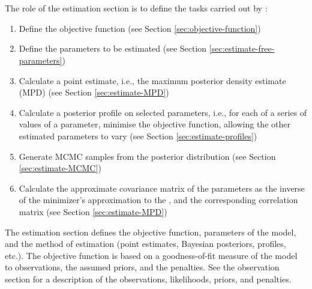 \section{\label{sec:estimation-section}}

\subsection{\label{sec:role-of-the-estimation-section}}

The role of the estimation section is to define the tasks carried out by \CNAME:

\begin{enumerate}
  \item Define the objective function (see Section \ref{sec:objective-function})
  \item Define the parameters to be estimated (see Section \ref{sec:estimate-free-parameters})
  \item Calculate a point estimate, i.e., the maximum posterior density estimate (MPD) (see Section \ref{sec:estimate-MPD})
  \item Calculate a posterior profile on selected parameters, i.e., for each of a series of values of a parameter, minimise the objective function, allowing the other estimated parameters to vary (see Section \ref{sec:estimate-profiles})
  \item Generate MCMC samples from the posterior distribution (see Section \ref{sec:estimate-MCMC})
  \item Calculate the approximate covariance matrix of the parameters as the inverse of the minimizer\textquoteright{}s approximation to the , and the corresponding correlation matrix (see Section \ref{sec:estimate-MPD})
\end{enumerate}

The estimation section defines the objective function, parameters of the model, and the method of estimation (point estimates, Bayesian posteriors, profiles, etc.). The objective function is based on a goodness-of-fit measure of the model to observations, the assumed priors, and the penalties. See the observation section for a description of the observations, likelihoods, priors, and penalties.

\subsection{\label{sec:objective-function}}

